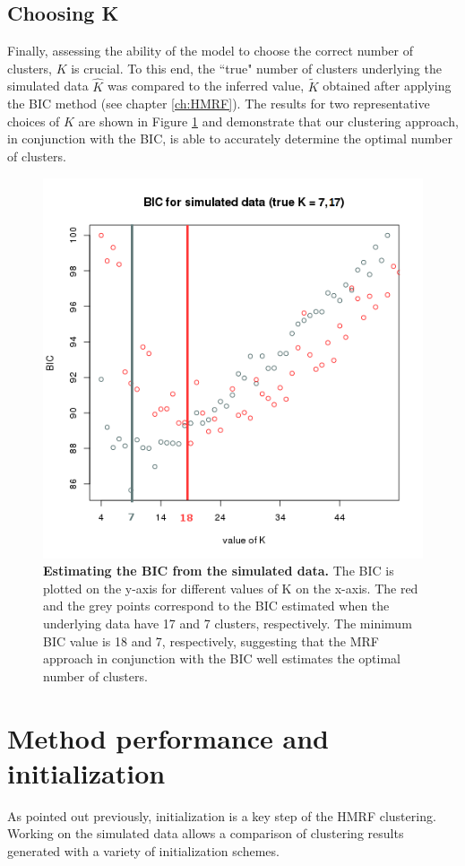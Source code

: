 	\subsection{Choosing K}
	
Finally, assessing the ability of the model to choose the correct number of clusters, $K$ is crucial. To this end, the ``true" number of clusters underlying the simulated data $\hat{K}$ was compared to the inferred value, $\widetilde{K}$ obtained after applying the BIC method (see chapter \ref{ch:HMRF}). The results for two representative choices of $K$ are shown in Figure \ref{fig:simulatedK} and demonstrate that our clustering approach, in conjunction with the BIC, is able to accurately determine the optimal number of clusters.\\

	\begin{figure}[H]
\centerline{\includegraphics[width=0.8\linewidth]{gfx/chapter5/simulated_k.png}}
\caption{{\bf Estimating the BIC from the simulated data.} The BIC is plotted on the y-axis for different values of K on the x-axis. The red and the grey points correspond to the BIC estimated when the underlying data have 17 and 7 clusters, respectively. The minimum BIC value is 18 and 7, respectively, suggesting that the MRF approach in conjunction with the BIC well estimates the optimal number of clusters.}
\label{fig:simulatedK}
	\end{figure}

\section{Method performance and initialization}\label{sec:method_comparison}
As pointed out previously, initialization is a key step of the HMRF clustering. Working on the simulated data allows a comparison of clustering results generated with a variety of initialization schemes.
